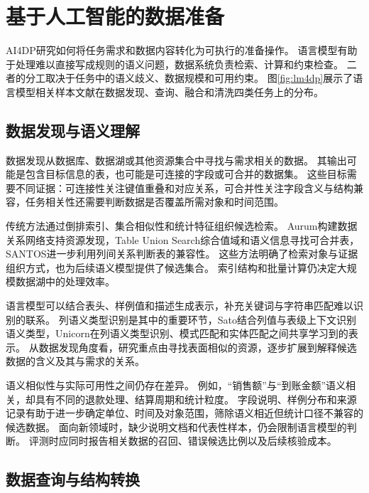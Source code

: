 \section{基于人工智能的数据准备}

AI4DP研究如何将任务需求和数据内容转化为可执行的准备操作。
语言模型有助于处理难以直接写成规则的语义问题，数据系统负责检索、计算和约束检查。
二者的分工取决于任务中的语义歧义、数据规模和可用约束。
图\ref{fig:lm4dp}展示了语言模型相关样本文献在数据发现、查询、融合和清洗四类任务上的分布。


\subsection{数据发现与语义理解}

数据发现从数据库、数据湖或其他资源集合中寻找与需求相关的数据。
其输出可能是包含目标信息的表，也可能是可连接的字段或可合并的数据集。
这些目标需要不同证据：可连接性关注键值重叠和对应关系，可合并性关注字段含义与结构兼容，任务相关性还需要判断数据是否覆盖所需对象和时间范围。

传统方法通过倒排索引、集合相似性和统计特征组织候选检索。
Aurum构建数据关系网络支持资源发现，Table Union Search综合值域和语义信息寻找可合并表，SANTOS进一步利用列间关系判断表的兼容性。\cite{aurum,tus,santos}
这些方法明确了检索对象与证据组织方式，也为后续语义模型提供了候选集合。
索引结构和批量计算仍决定大规模数据湖中的处理效率。

语言模型可以结合表头、样例值和描述生成表示，补充关键词与字符串匹配难以识别的联系。
列语义类型识别是其中的重要环节，Sato结合列值与表级上下文识别语义类型，Unicorn在列语义类型识别、模式匹配和实体匹配之间共享学习到的表示。\cite{sato,unicorn}
从数据发现角度看，研究重点由寻找表面相似的资源，逐步扩展到解释候选数据的含义及其与需求的关系。

语义相似性与实际可用性之间仍存在差异。
例如，“销售额”与“到账金额”语义相关，却具有不同的退款处理、结算周期和统计粒度。
字段说明、样例分布和来源记录有助于进一步确定单位、时间及对象范围，筛除语义相近但统计口径不兼容的候选数据。
面向新领域时，缺少说明文档和代表性样本，仍会限制语言模型的判断。
评测时应同时报告相关数据的召回、错误候选比例以及后续核验成本。

\subsection{数据查询与结构转换}

